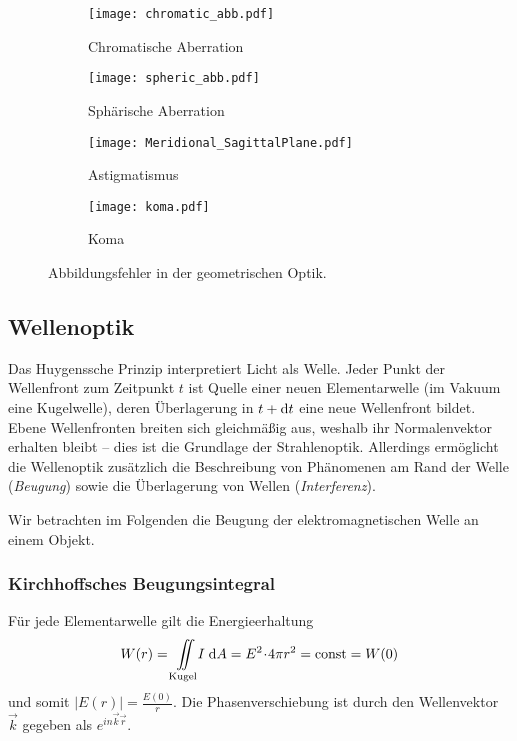\newpage
\begin{figure}[ht]
	\centering
	\begin{subfigure}[b]{0.45\textwidth}
		\centering
		\texttt{[image: chromatic\_abb.pdf]}
		\caption{Chromatische Aberration}
		\label{fig:chromatic_abb}
	\end{subfigure}
	\hfill
	\begin{subfigure}[b]{0.45\textwidth}
		\centering
		\texttt{[image: spheric\_abb.pdf]}
		\caption{\marker Sphärische Aberration}
		\label{fig:spheric_abb}
	\end{subfigure}
	
	\begin{subfigure}[b]{0.45\textwidth}
		\centering
		\texttt{[image: Meridional\_SagittalPlane.pdf]}
		\caption{Astigmatismus \cite{lit:wiki_astigma}}
		\label{fig:astigmatismus}
	\end{subfigure}
	\hfill
	\begin{subfigure}[b]{0.45\textwidth}
		\centering
		\texttt{[image: koma.pdf]}
		\caption{\marker Koma}
		\label{fig:koma}
	\end{subfigure}
	\caption{Abbildungsfehler in der geometrischen Optik.}
\end{figure}

\subsection{Wellenoptik}
Das Huygenssche Prinzip interpretiert Licht als Welle. Jeder Punkt der Wellenfront zum Zeitpunkt $t$ ist Quelle einer neuen Elementarwelle (im Vakuum eine Kugelwelle), deren Überlagerung in $t + \mathrm{d} t$ eine neue Wellenfront bildet. Ebene Wellenfronten breiten sich gleichmäßig aus, weshalb ihr Normalenvektor erhalten bleibt -- dies ist die Grundlage der Strahlenoptik. Allerdings ermöglicht die Wellenoptik zusätzlich die Beschreibung von Phänomenen am Rand der Welle (\emph{Beugung}) sowie die Überlagerung von Wellen (\emph{Interferenz}).

Wir betrachten im Folgenden die Beugung der elektromagnetischen Welle an einem Objekt.

\subsubsection{Kirchhoffsches Beugungsintegral}
Für jede Elementarwelle gilt die Energieerhaltung
\begin{equation}
W(r) = \iint\limits_\text{Kugel}\!\! I \;\mathrm{d} A = E^2 \!\cdot\! 4 \pi r^2 = \operatorname{const} = W(0)
\end{equation}
und somit $|E(r)| = \frac{E(0)}{r}$. Die Phasenverschiebung ist durch den Wellenvektor $\vec k$ gegeben als $e^{i n \vec k \vec r}$.

